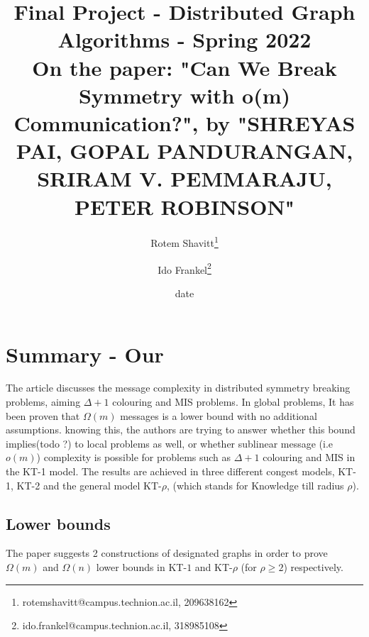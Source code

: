 \documentclass[11pt]{article}
\begin{document}
\title{Final Project - Distributed Graph Algorithms - Spring 2022\\
On the paper: "Can We Break Symmetry with o(m) Communication?", by "SHREYAS PAI, GOPAL PANDURANGAN, SRIRAM V. PEMMARAJU, PETER ROBINSON"
}
\author{Rotem Shavitt\footnote{rotemshavitt@campus.technion.ac.il, 209638162} \and Ido Frankel\footnote{ido.frankel@campus.technion.ac.il, 318985108}
}
\date{date}
	\maketitle

\section*{Summary - Our}

The article discusses the message complexity in distributed symmetry breaking problems, aiming $\Delta + 1 $ colouring and MIS problems. In global problems, It has been proven that $\Omega(m)$ messages is a lower bound with no additional assumptions. knowing this, the authors are trying to answer whether this bound implies(todo ?) to local problems as well, or whether sublinear message (i.e $o(m)$) complexity is possible for problems such as $\Delta +1$ colouring and MIS in the KT-1 model. The results are achieved in three different congest models, KT-1, KT-2 and the general model KT-$\rho$, (which stands for Knowledge till radius $\rho$).

\subsection*{Lower bounds}
The paper suggests 2 constructions of designated graphs in order to prove $\Omega(m)$ and $\Omega(n)$ lower bounds in KT-$1$ and KT-$\rho$ (for $\rho \ge 2$) respectively. 
\end{document}
